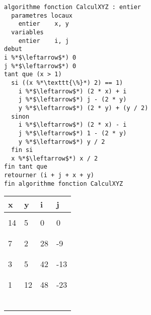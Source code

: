 \documentclass[11pt,a4paper]{article}
\begin{document}
\begin{table}[h!]
  \centering
  \begin{minipage}{0.59\textwidth}
    \centering
\begin{lstlisting}[style=algorithmique]
algorithme fonction CalculXYZ : entier
  parametres locaux
    entier    x, y
  variables
    entier    i, j
debut
i %*$\leftarrow$*) 0
j %*$\leftarrow$*) 0
tant que (x > 1)
  si ((x %*\texttt{\%}*) 2) == 1)
    i %*$\leftarrow$*) (2 * x) + i
    j %*$\leftarrow$*) j - (2 * y)
    y %*$\leftarrow$*) (2 * y) + (y / 2)
  sinon
    i %*$\leftarrow$*) (2 * x) - i
    j %*$\leftarrow$*) 1 - (2 * y)
    y %*$\leftarrow$*) y / 2
  fin si
  x %*$\leftarrow$*) x / 2
fin tant que
retourner (i + j + x + y)
fin algorithme fonction CalculXYZ \end{lstlisting}
  \end{minipage}
  \hfillx
  \begin{minipage}{0.4\textwidth}
    \centering
    \begin{tabular}{| C{1cm} | C{1cm} | C{1cm} | C{1cm} |}
        \hline
          x  &  y  &  i  &   j   \\
        \hline
             &     &     &       \\
         14  &  5  &  0  &   0   \\
             &     &     &       \\
        \hline
             &     &     &       \\
          7  &  2  &  28 &  -9   \\
             &     &     &       \\
        \hline
             &     &     &       \\
          3  &  5  & 42  &  -13  \\
             &     &     &       \\
        \hline
             &     &     &       \\
          1  &  12 & 48  &  -23  \\
             &     &     &       \\
        \hline
             &     &     &       \\
             &     &     &       \\
             &     &     &       \\
        \hline
             &     &     &       \\
             &     &     &       \\

\end{tabular}
\end{minipage}
\end{table}
\end{document}
